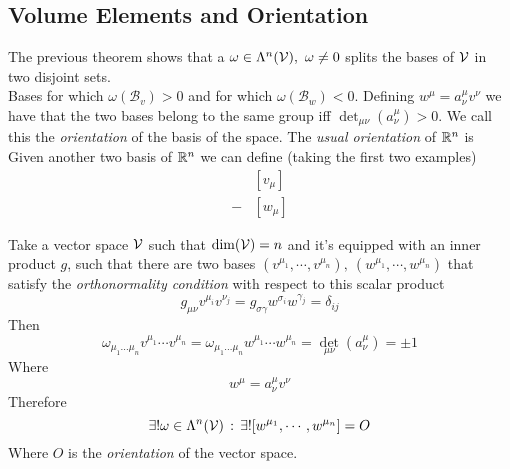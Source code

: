 \documentclass[../complete.tex]{subfiles}
\begin{document}
\subsection{Volume Elements and Orientation}
\begin{dfn}[Orientation]
	The previous theorem shows that a $\omega\in\Lambda^n(\mathcal{V}),\ \omega\ne0$ splits the bases of $\mathcal{V}$ in two disjoint sets.\\
	Bases for which $\omega(\mathcal{B}_v)>0$ and for which $\omega(\mathcal{B}_w)<0$. Defining $w^{\mu}=a^\mu_\nu v^\nu$ we have that the two bases belong to the same group iff $\det_{\mu\nu}(a^\mu_\nu)>0$. We call this the \textit{orientation} of the basis of the space. The \textit{usual orientation} of $\mathbb{R}^n$ is
	\begin{equation*}
		[e_\mu]
	\end{equation*}
	Given another two basis of $\mathbb{R}^n$ we can define (taking the first two examples)
	\begin{equation*}
		\begin{aligned}
			&[v_\mu]\\
			-&[w_\mu]
		\end{aligned}
	\end{equation*}
\end{dfn}
\begin{dfn}
	Take a vector space $\mathcal{V}$ such that $\dim(\mathcal{V})=n$ and it's equipped with an inner product $g$, such that there are two bases $(v^{\mu_1},\cdots,v^{\mu_n}),\ (w^{\mu_1},\cdots,w^{\mu_n})$ that satisfy the \textit{orthonormality condition} with respect to this scalar product
	\begin{equation}
		g_{\mu\nu}v^{\mu_i} v^{\nu_j}=g_{\sigma\gamma}w^{\sigma_i} w^{\gamma_j}=\delta_{ij}
		\label{eq:boncond}
	\end{equation}
	Then
	\begin{equation*}
		\omega_{\mu_1\ldots\mu_n}v^{\mu_1}\cdots v^{\mu_n}=\omega_{\mu_1\ldots\mu_n}w^{\mu_1}\cdots w^{\mu_n}=\det_{\mu\nu}(a^\mu_\nu)=\pm 1
	\end{equation*}
	Where
	\begin{equation*}
		w^\mu=a^\mu_\nu v^\nu
	\end{equation*}
	Therefore
	\begin{equation*}
		\exists!\omega\in\Lambda^n(\mathcal{V})\, :\, \exists![w^{\mu_1},\cdots,w^{\mu_n}]=O
	\end{equation*}
	Where $O$ is the \textit{orientation} of the vector space.
\end{dfn}
\end{document}
